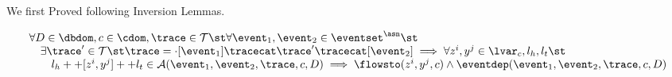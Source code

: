 We first Proved following Inversion Lemmas.


\clearpage
\begin{thm}
\label{thm:alg_correct}
\[
  \begin{array}{l}
    \forall D \in \dbdom , c \in \cdom, \trace \in \mathcal{T} \st \forall \event_1, \event_2 \in \eventset^{\asn} \st
    \\ \quad 
     \exists \trace' \in \mathcal{T} \st \trace = \cdot [\event_1] \tracecat \trace' \tracecat [\event_2]
     \implies    \forall  z^i, y^j \in \lvar_c, l_h, l_t \st 
    \\ \qquad 
     l_h ++ [z^i, y^j] ++ l_t \in \mathcal{A}(\event_1, \event_2, \trace, c, D)
     \implies \flowsto(z^i, y^j, c) \land \eventdep(\event_1, \event_2, \trace, {c}, D) 
  \end{array}
\]
\end{thm}

